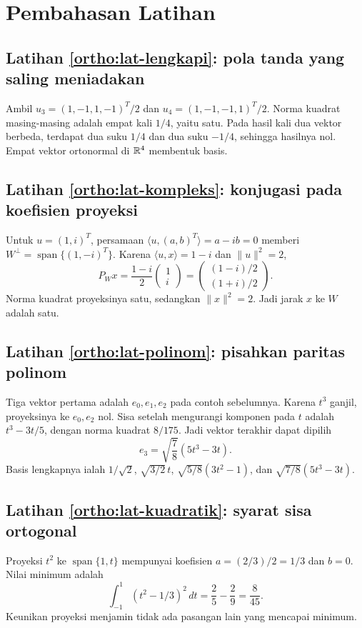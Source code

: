 \ifpembahasan
\section{Pembahasan Latihan}

\subsection*{Latihan \ref{ortho:lat-lengkapi}: pola tanda yang saling meniadakan}
Ambil $u_3=(1,-1,1,-1)^T/2$ dan $u_4=(1,-1,-1,1)^T/2$.
Norma kuadrat masing-masing adalah empat kali $1/4$, yaitu satu.
Pada hasil kali dua vektor berbeda, terdapat dua suku $1/4$
dan dua suku $-1/4$, sehingga hasilnya nol.
Empat vektor ortonormal di $\mathbb{R}^4$ membentuk basis.

\subsection*{Latihan \ref{ortho:lat-kompleks}: konjugasi pada koefisien proyeksi}
Untuk $u=(1,i)^T$, persamaan $\langle u,(a,b)^T\rangle=a-ib=0$
memberi $W^\perp=\operatorname{span}\{(1,-i)^T\}$.
Karena $\langle u,x\rangle=1-i$ dan $\|u\|^2=2$,
\[
    P_Wx=\frac{1-i}{2}\begin{pmatrix}1\\i\end{pmatrix}
        =\begin{pmatrix}(1-i)/2\\(1+i)/2\end{pmatrix}.
\]
Norma kuadrat proyeksinya satu, sedangkan $\|x\|^2=2$.
Jadi jarak $x$ ke $W$ adalah satu.

\subsection*{Latihan \ref{ortho:lat-polinom}: pisahkan paritas polinom}
Tiga vektor pertama adalah $e_0,e_1,e_2$ pada contoh sebelumnya.
Karena $t^3$ ganjil, proyeksinya ke $e_0,e_2$ nol.
Sisa setelah mengurangi komponen pada $t$ adalah $t^3-3t/5$,
dengan norma kuadrat $8/175$. Jadi vektor terakhir dapat dipilih
\[
    e_3=\sqrt{\frac78}(5t^3-3t).
\]
Basis lengkapnya ialah
$1/\sqrt2$, $\sqrt{3/2}\,t$, $\sqrt{5/8}(3t^2-1)$,
dan $\sqrt{7/8}(5t^3-3t)$.

\subsection*{Latihan \ref{ortho:lat-kuadratik}: syarat sisa ortogonal}
Proyeksi $t^2$ ke $\operatorname{span}\{1,t\}$ mempunyai
koefisien $a=(2/3)/2=1/3$ dan $b=0$.
Nilai minimum adalah
\[
    \int_{-1}^1(t^2-1/3)^2\,dt=\frac25-\frac29=\frac8{45}.
\]
Keunikan proyeksi menjamin tidak ada pasangan lain yang mencapai minimum.

